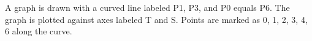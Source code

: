 A graph is drawn with a curved line labeled P1, P3, and P0 equals P6. The graph is plotted against axes labeled T and S. Points are marked as 0, 1, 2, 3, 4, 6 along the curve.